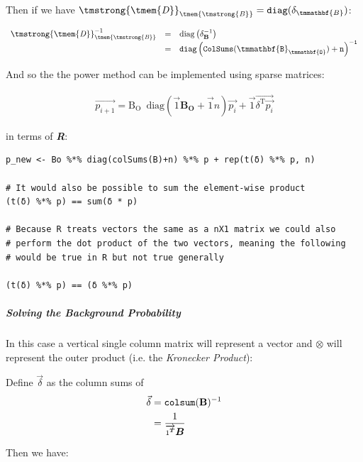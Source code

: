 \documentclass[11pt]{article}
\begin{document}
Then if we have \(\mathit{{\tmstrong{{\tmem{D}}}}}_{\mathit{{\tmem{{\tmstrong{B}}}}}} =
\mathtt{diag} (\delta_{\tmmathbf{B}}) \mathtt{}\):


\[ \begin{array}{lll}
     \mathit{{\tmstrong{{\tmem{D}}}}}_{\mathit{{\tmem{{\tmstrong{B}}}}}}^{- 1}
     & = & \mathrm{diag} \left( \delta^{- 1}_{\mathbf{B}} \right)\\
     & = & \mathtt{diag} \left( \mathtt{ColSums}
     (\mathtt{\tmmathbf{B}_{\tmmathbf{O}}}) + \mathtt{n}
     \right)^{\mathtt{- 1}}
   \end{array} \]

And so the the power method can be implemented using sparse matrices:

\begin{align}
\vec{p_{i+1}} = \mathrm{B_{O}} \enspace \mathrm{diag}\left( \vec{1} \mathbf{B_{O}} + \vec{1}n \right) \vec{p_{i}} + \vec{1} \vec{\delta^{\mathrm{T}}\vec{p_{i}}}
\end{align}

in terms of \textbf{\emph{R}}:

\begin{verbatim}
p_new <- Bo %*% diag(colSums(B)+n) %*% p + rep(t(δ) %*% p, n)

# It would also be possible to sum the element-wise product
(t(δ) %*% p) == sum(δ * p)

# Because R treats vectors the same as a nX1 matrix we could also
# perform the dot product of the two vectors, meaning the following
# would be true in R but not true generally

(t(δ) %*% p) == (δ %*% p)
\end{verbatim}


\subparagraph{Solving the Background Probability}
\label{solve-background-prob-power-walk-sparse}
In this case a vertical single column matrix will represent a vector and \(\otimes\) will represent the outer product (i.e. the \emph{Kronecker Product}):



Define \(\vec{\delta}\) as the column sums of
\[\begin{aligned}
     \vec{\delta} & = \mathtt{colsum} (\text{{\bfseries{B}}})^{- 1}\\
     & = \frac{1}{\overrightarrow{1^{{\scriptsize \ensuremath{\boldsymbol{T}}}}}
     \ensuremath{\boldsymbol{B}}}
   \end{aligned}\]


Then we have:
\end{document}

